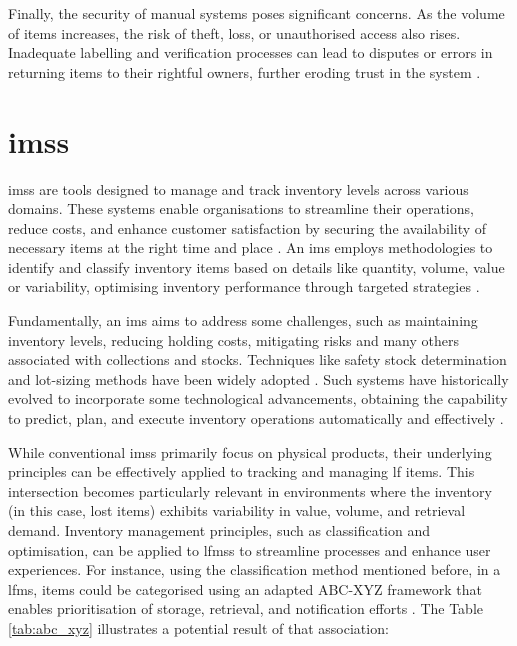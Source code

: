 Finally, the security of manual systems poses significant concerns. As the volume of items increases, the risk of theft, loss, or unauthorised access also rises. Inadequate labelling and verification processes can lead to disputes or errors in returning items to their rightful owners, further eroding trust in the system \cite{Guinard2008}.


\section{\aclp{ims}} \label{sec:ims}

\acp{ims} are tools designed to manage and track inventory levels across various domains. These systems enable organisations to streamline their operations, reduce costs, and enhance customer satisfaction by securing the availability of necessary items at the right time and place \cite{Pauliina2024}. An \ac{ims} employs methodologies to identify and classify inventory items based on details like quantity, volume, value or variability, optimising inventory performance through targeted strategies \cite{Pauliina2024}.

Fundamentally, an \ac{ims} aims to address some challenges, such as maintaining inventory levels, reducing holding costs, mitigating risks and many others associated with collections and stocks. Techniques like safety stock determination and lot-sizing methods have been widely adopted \cite{Prabakaran2023}. Such systems have historically evolved to incorporate some technological advancements, obtaining the capability to predict, plan, and execute inventory operations automatically and effectively \cite{Chebet2019}.

While conventional \acp{ims} primarily focus on physical products, their underlying principles can be effectively applied to tracking and managing \ac{lf} items. This intersection becomes particularly relevant in environments where the inventory (in this case, lost items) exhibits variability in value, volume, and retrieval demand. Inventory management principles, such as classification and optimisation, can be applied to \acp{lfms} to streamline processes and enhance user experiences. For instance, using the classification method mentioned before, in a \ac{lfms}, items could be categorised using an adapted ABC-XYZ framework \cite{Suryaputri2020} that enables prioritisation of storage, retrieval, and notification efforts \cite{Khobragade2018}. The Table \ref{tab:abc_xyz} illustrates a potential result of that association:


